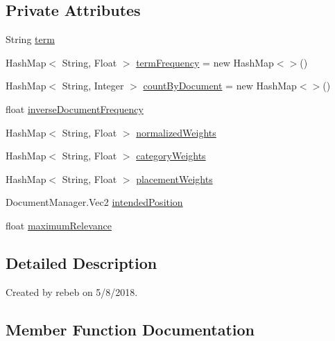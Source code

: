 \subsection*{Private Attributes}
\begin{DoxyCompactItemize}
\item 
String \mbox{\hyperlink{classio_1_1github_1_1syzygy2048_1_1radcloud_1_1_word_a6315b33ceb56892c35cf85ba006bb404}{term}}
\item 
Hash\+Map$<$ String, Float $>$ \mbox{\hyperlink{classio_1_1github_1_1syzygy2048_1_1radcloud_1_1_word_afd48720786b3805982c8afbc8b2e182e}{term\+Frequency}} = new Hash\+Map$<$$>$()
\item 
Hash\+Map$<$ String, Integer $>$ \mbox{\hyperlink{classio_1_1github_1_1syzygy2048_1_1radcloud_1_1_word_acabb157342af2ce8233ecfa0061dfc08}{count\+By\+Document}} = new Hash\+Map$<$$>$()
\item 
float \mbox{\hyperlink{classio_1_1github_1_1syzygy2048_1_1radcloud_1_1_word_a7e900346d6a4ce49783a11c9dac7ee57}{inverse\+Document\+Frequency}}
\item 
Hash\+Map$<$ String, Float $>$ \mbox{\hyperlink{classio_1_1github_1_1syzygy2048_1_1radcloud_1_1_word_a73284999ac4b313793306806096f6a86}{normalized\+Weights}}
\item 
Hash\+Map$<$ String, Float $>$ \mbox{\hyperlink{classio_1_1github_1_1syzygy2048_1_1radcloud_1_1_word_ad698485d567053d6752dbec826506744}{category\+Weights}}
\item 
Hash\+Map$<$ String, Float $>$ \mbox{\hyperlink{classio_1_1github_1_1syzygy2048_1_1radcloud_1_1_word_a8023b6dc40adf585ad20ba73ab237bab}{placement\+Weights}}
\item 
Document\+Manager.\+Vec2 \mbox{\hyperlink{classio_1_1github_1_1syzygy2048_1_1radcloud_1_1_word_a064f2f7f9b0e939fe3b2cfd2cc87817f}{intended\+Position}}
\item 
float \mbox{\hyperlink{classio_1_1github_1_1syzygy2048_1_1radcloud_1_1_word_aed758b7df9156075124f25815df3f045}{maximum\+Relevance}}
\end{DoxyCompactItemize}


\subsection{Detailed Description}
Created by rebeb on 5/8/2018. 

\subsection{Member Function Documentation}
\mbox{\label{classio_1_1github_1_1syzygy2048_1_1radcloud_1_1_word_a47529581dc9d3302b054c7a33981c375}} 
